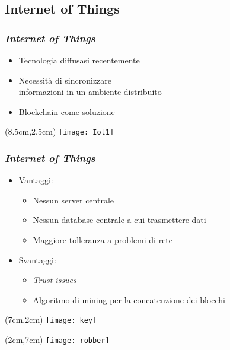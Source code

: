 \subsection{Internet of Things}
\begin{frame}
 \frametitle{\textit{Internet of Things}}

 \begin{itemize}
  \item<1-> Tecnologia diffusasi recentemente
  \item<2-> Necessit\`a di sincronizzare \\ informazioni in un ambiente
distribuito
  \item<3-> Blockchain come soluzione
 \end{itemize}

 \begin{textblock*}{5cm}(8.5cm,2.5cm)
  \texttt{[image: Iot1]}
 \end{textblock*}

\end{frame}

\begin{frame}
 \frametitle{\textit{Internet of Things}}

 \begin{itemize}
  \item<1-> Vantaggi:
  \begin{itemize}
   \item Nessun server centrale
   \item Nessun database centrale a cui trasmettere dati
   \item Maggiore tolleranza a problemi di rete
  \end{itemize}

  \item<2-> Svantaggi:
  \begin{itemize}
   \item \textit{Trust issues}
   \item Algoritmo di mining per la concatenzione dei blocchi
  \end{itemize}

 \end{itemize}


 \begin{textblock*}{5cm}(7cm,2cm)
  \texttt{[image: key]}
 \end{textblock*}


 \begin{textblock*}{5cm}(2cm,7cm)
  \texttt{[image: robber]}
 \end{textblock*}

\end{frame}
